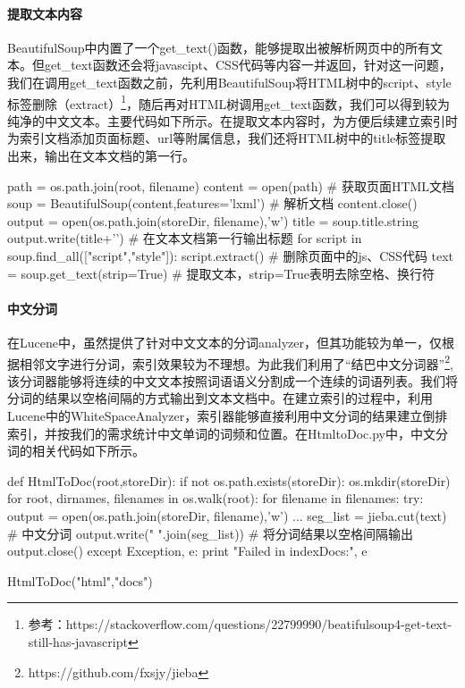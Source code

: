\documentclass{article}
\begin{document}
\paragraph{提取文本内容}
BeautifulSoup中内置了一个get\_text()函数，能够提取出被解析网页中的所有文本。但get\_text函数还会将javascipt、CSS代码等内容一并返回，针对这一问题，我们在调用get\_text函数之前，先利用BeautifulSoup将HTML树中的script、style标签删除（extract）\footnote{参考：https://stackoverflow.com/questions/22799990/beatifulsoup4-get-text-still-has-javascript}，随后再对HTML树调用get\_text函数，我们可以得到较为纯净的中文文本。主要代码如下所示。在提取文本内容时，为方便后续建立索引时为索引文档添加页面标题、url等附属信息，我们还将HTML树中的title标签提取出来，输出在文本文档的第一行。

\begin{python}
path = os.path.join(root, filename)
content = open(path)                                # 获取页面HTML文档
soup = BeautifulSoup(content,features='lxml')       # 解析文档
content.close()
output = open(os.path.join(storeDir, filename),'w')
title = soup.title.string
output.write(title+'\n')                            # 在文本文档第一行输出标题
for script in soup.find_all(["script","style"]):
    script.extract()                                # 删除页面中的js、CSS代码      
text = soup.get_text(strip=True)                    # 提取文本，strip=True表明去除空格、换行符
\end{python}

\paragraph{中文分词}
在Lucene中，虽然提供了针对中文文本的分词analyzer，但其功能较为单一，仅根据相邻文字进行分词，索引效果较为不理想。为此我们利用了“结巴中文分词器”\footnote{https://github.com/fxsjy/jieba},该分词器能够将连续的中文文本按照词语语义分割成一个连续的词语列表。我们将分词的结果以空格间隔的方式输出到文本文档中。在建立索引的过程中，利用Lucene中的WhiteSpaceAnalyzer，索引器能够直接利用中文分词的结果建立倒排索引，并按我们的需求统计中文单词的词频和位置。在HtmltoDoc.py中，中文分词的相关代码如下所示。

\begin{python}
def HtmlToDoc(root,storeDir):
    if not os.path.exists(storeDir):
        os.mkdir(storeDir)
    for root, dirnames, filenames in os.walk(root):
        for filename in filenames:
            try:
                output = open(os.path.join(storeDir, filename),'w')
                ...
                seg_list = jieba.cut(text)          # 中文分词
                output.write(" ".join(seg_list))    # 将分词结果以空格间隔输出
                output.close()
            except Exception, e:
                print "Failed in indexDocs:", e

HtmlToDoc("html","docs")
\end{python}
\end{document}
